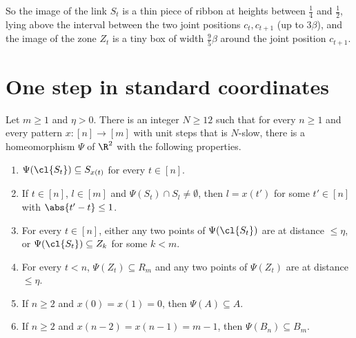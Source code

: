 
So the image of the link $S_t$ is a thin piece of ribbon at heights between $\frac14$ and $\frac12$,
lying above the interval between the two joint positions $c_t,c_{t+1}$ (up to $3\beta$), and the
image of the zone $Z_t$ is a tiny box of width $\frac95\beta$ around the joint position $c_{t+1}$.

\section{One step in standard coordinates}

\begin{proposition}\label{prop:std-step}
Let $m\ge1$ and $\eta>0$. There is an integer $N\ge12$ such that for every $n\ge1$ and every
pattern $x\colon[n]\to[m]$ with unit steps that is $N$-slow, there is a homeomorphism $\Psi$ of
$\R^2$ with the following properties.
\begin{enumerate}[label=(S\arabic*)]
\item\label{S:follow} $\Psi(\cl{S_t})\subseteq S_{x(t)}$ for every $t\in[n]$.
\item\label{S:tight} If $t\in[n]$, $l\in[m]$ and $\Psi(S_t)\cap S_l\neq\emptyset$, then $l=x(t')$ for
some $t'\in[n]$ with $\abs{t'-t}\le1$.
\item\label{S:small} For every $t\in[n]$, either any two points of $\Psi(\cl{S_t})$ are at distance
$\le\eta$, or $\Psi(\cl{S_t})\subseteq Z_k$ for some $k<m$.
\item\label{S:zone} For every $t<n$, $\Psi(Z_t)\subseteq R_m$ and any two points of $\Psi(Z_t)$ are
at distance $\le\eta$.
\item\label{S:A} If $n\ge2$ and $x(0)=x(1)=0$, then $\Psi(A)\subseteq A$.
\item\label{S:B} If $n\ge2$ and $x(n-2)=x(n-1)=m-1$, then $\Psi(B_n)\subseteq B_m$.
\end{enumerate}
\end{proposition}

